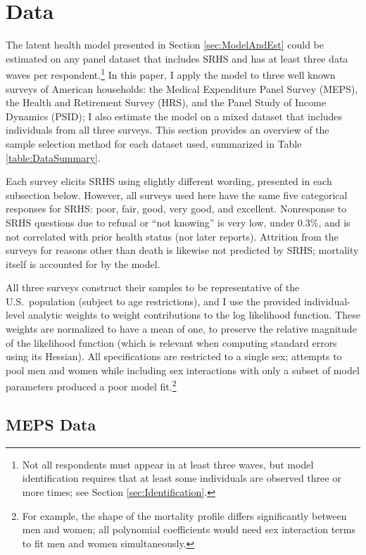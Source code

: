 \documentclass[12pt,pdftex,letterpaper]{article}
\newcommand{\RootDir}{..}
\newcommand{\TablesDir}{\RootDir/Tables}
\begin{document}
\section{Data}\label{sec:Data}

The latent health model presented in Section \ref{sec:ModelAndEst} could be estimated on any panel dataset that includes SRHS and has at least three data waves per respondent.\footnote{Not all respondents must appear in at least three waves, but model identification requires that at least some individuals are observed three or more times; see Section \ref{sec:Identification}.}  In this paper, I apply the model to three well known surveys of American households: the Medical Expenditure Panel Survey (MEPS), the Health and Retirement Survey (HRS), and the Panel Study of Income Dynamics (PSID); I also estimate the model on a mixed dataset that includes individuals from all three surveys.  This section provides an overview of the sample selection method for each dataset used, summarized in Table \ref{table:DataSummary}.



Each survey elicits SRHS using slightly different wording, presented in each subsection below.  However, all surveys used here have the same five categorical responses for SRHS: poor, fair, good, very good, and excellent.  Nonresponse to SRHS questions due to refusal or ``not knowing'' is very low, under 0.3\%, and is not correlated with prior health status (nor later reports).  Attrition from the surveys for reasons other than death is likewise not predicted by SRHS; mortality itself is accounted for by the model.

All three surveys construct their samples to be representative of the U.S.\ population (subject to age restrictions), and I use the provided individual-level analytic weights to weight contributions to the log likelihood function.  These weights are normalized to have a mean of one, to preserve the relative magnitude of the likelihood function (which is relevant when computing standard errors using its Hessian).  All specifications are restricted to a single sex; attempts to pool men and women while including sex interactions with only a subset of model parameters produced a poor model fit.\footnote{For example, the shape of the mortality profile differs significantly between men and women; all polynomial coefficients would need sex interaction terms to fit men and women simultaneously.}


\subsection{MEPS Data}\label{sec:MEPS}
\end{document}
